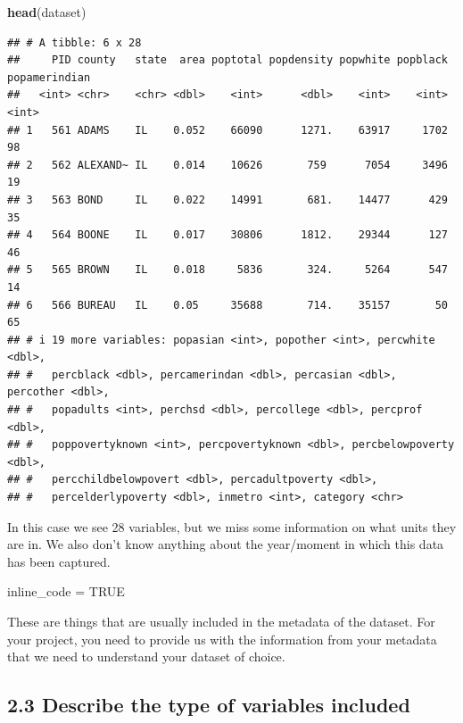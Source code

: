 \documentclass[
]{article}
\newenvironment{Shaded}{\begin{snugshade}}{\end{snugshade}}
\newcommand{\ConstantTok}[1]{\textcolor[rgb]{0.56,0.35,0.01}{#1}}
\newcommand{\FunctionTok}[1]{\textcolor[rgb]{0.13,0.29,0.53}{\textbf{#1}}}
\newcommand{\NormalTok}[1]{#1}
\newcommand{\OtherTok}[1]{\textcolor[rgb]{0.56,0.35,0.01}{#1}}
\begin{document}
\begin{Shaded}
\begin{Highlighting}[]
\FunctionTok{head}\NormalTok{(dataset)}
\end{Highlighting}
\end{Shaded}

\begin{verbatim}
## # A tibble: 6 x 28
##     PID county   state  area poptotal popdensity popwhite popblack popamerindian
##   <int> <chr>    <chr> <dbl>    <int>      <dbl>    <int>    <int>         <int>
## 1   561 ADAMS    IL    0.052    66090      1271.    63917     1702            98
## 2   562 ALEXAND~ IL    0.014    10626       759      7054     3496            19
## 3   563 BOND     IL    0.022    14991       681.    14477      429            35
## 4   564 BOONE    IL    0.017    30806      1812.    29344      127            46
## 5   565 BROWN    IL    0.018     5836       324.     5264      547            14
## 6   566 BUREAU   IL    0.05     35688       714.    35157       50            65
## # i 19 more variables: popasian <int>, popother <int>, percwhite <dbl>,
## #   percblack <dbl>, percamerindan <dbl>, percasian <dbl>, percother <dbl>,
## #   popadults <int>, perchsd <dbl>, percollege <dbl>, percprof <dbl>,
## #   poppovertyknown <int>, percpovertyknown <dbl>, percbelowpoverty <dbl>,
## #   percchildbelowpovert <dbl>, percadultpoverty <dbl>,
## #   percelderlypoverty <dbl>, inmetro <int>, category <chr>
\end{verbatim}

In this case we see 28 variables, but we miss some information on what
units they are in. We also don't know anything about the year/moment in
which this data has been captured.

\begin{Shaded}
\begin{Highlighting}[]
\NormalTok{inline\_code }\OtherTok{=} \ConstantTok{TRUE}
\end{Highlighting}
\end{Shaded}

These are things that are usually included in the metadata of the
dataset. For your project, you need to provide us with the information
from your metadata that we need to understand your dataset of choice.

\subsection{2.3 Describe the type of variables
included}\label{describe-the-type-of-variables-included}
\end{document}
